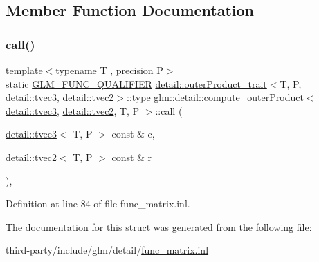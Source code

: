 \subsection{Member Function Documentation}
\mbox{\label{structglm_1_1detail_1_1compute__outer_product_3_01detail_1_1tvec3_00_01detail_1_1tvec2_00_01_t_00_01_p_01_4_a96862a6cc9a974bd7dcc4068f433ccf5}} 
\subsubsection{\texorpdfstring{call()}{call()}}
{\footnotesize\ttfamily template$<$typename T , precision P$>$ \\
static \hyperlink{setup_8hpp_a33fdea6f91c5f834105f7415e2a64407}{G\+L\+M\+\_\+\+F\+U\+N\+C\+\_\+\+Q\+U\+A\+L\+I\+F\+I\+ER} \hyperlink{structglm_1_1detail_1_1outer_product__trait}{detail\+::outer\+Product\+\_\+trait}$<$T, P, \hyperlink{structglm_1_1detail_1_1tvec3}{detail\+::tvec3}, \hyperlink{structglm_1_1detail_1_1tvec2}{detail\+::tvec2}$>$\+::type \hyperlink{structglm_1_1detail_1_1compute__outer_product}{glm\+::detail\+::compute\+\_\+outer\+Product}$<$ \hyperlink{structglm_1_1detail_1_1tvec3}{detail\+::tvec3}, \hyperlink{structglm_1_1detail_1_1tvec2}{detail\+::tvec2}, T, P $>$\+::call (\begin{DoxyParamCaption}\item[{\hyperlink{structglm_1_1detail_1_1tvec3}{detail\+::tvec3}$<$ T, P $>$ const \&}]{c,  }\item[{\hyperlink{structglm_1_1detail_1_1tvec2}{detail\+::tvec2}$<$ T, P $>$ const \&}]{r }\end{DoxyParamCaption})\hspace{0.3cm}{\ttfamily [inline]}, {\ttfamily [static]}}



Definition at line 84 of file func\+\_\+matrix.\+inl.



The documentation for this struct was generated from the following file\+:\begin{DoxyCompactItemize}
\item 
third-\/party/include/glm/detail/\hyperlink{func__matrix_8inl}{func\+\_\+matrix.\+inl}\end{DoxyCompactItemize}
